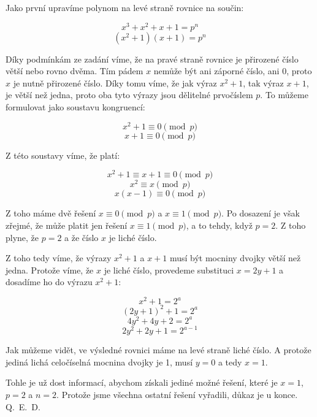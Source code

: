 \documentclass{fkssolpub}
\author{Ondřej Sedláček}
\begin{document}
Jako první upravíme polynom na levé straně rovnice na součin:

\[
	x^3 + x^2 + x + 1 = p^n
\]
\[
	(x^2 + 1)(x + 1) = p^n
\]

Díky podmínkám ze zadání víme, že na pravé straně rovnice je přirozené číslo větší nebo rovno dvěma. Tím pádem $x$ nemůže být ani záporné číslo, ani 0, proto $x$ je nutně přirozené číslo. Díky tomu víme, že jak výraz $x^2 + 1$, tak výraz $x + 1$, je větší než jedna, proto oba tyto výrazy jsou dělitelné prvočíslem $p$. To můžeme formulovat jako soustavu kongruencí:

\[
	x^2 + 1 \equiv 0 \pmod{p}
\]
\[
	x + 1 \equiv 0 \pmod{p}
\]

Z této soustavy víme, že platí:

\[
	x^2 + 1 \equiv x + 1 \equiv 0 \pmod{p}
\]
\[
	x^2 \equiv x \pmod{p}
\]
\[
	x (x - 1) \equiv 0 \pmod{p}
\]

Z toho máme dvě řešení $x \equiv 0 \pmod{p}$ a $x \equiv 1 \pmod{p}$. Po dosazení je však zřejmé, že může platit jen řešení $x \equiv 1 \pmod{p}$, a to tehdy, když $p = 2$. Z toho plyne, že $p = 2$ a že číslo $x$ je liché číslo.

Z toho tedy víme, že výrazy $x^2 + 1$ a $x + 1$ musí být mocniny dvojky větší než jedna. Protože víme, že $x$ je liché číslo, provedeme substituci $x = 2y + 1$ a dosadíme ho do výrazu $x^2 + 1$:

\[
	x^2 + 1 = 2^a
\]
\[
	(2y + 1)^2 + 1 = 2^a
\]
\[
	4y^2 + 4y + 2 = 2^a
\]
\[
	2y^2 + 2y + 1 = 2^{a - 1}
\]

Jak můžeme vidět, ve výsledné rovnici máme na levé straně liché číslo. A protože jediná lichá celočíselná mocnina dvojky je 1, musí $y = 0$ a tedy $x = 1$.

Tohle je už dost informací, abychom získali jediné možné řešení, které je $x = 1$, $p = 2$ a $n = 2$. Protože jsme všechna ostatní řešení vyřadili, důkaz je u konce. Q.~E.~D.
\end{document}
